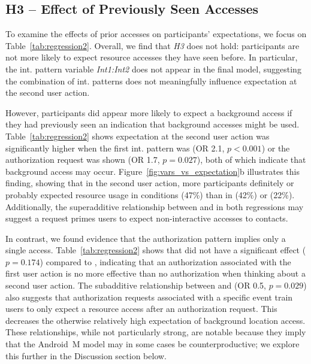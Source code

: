 \subsection{H3 -- Effect of Previously Seen Accesses}

To examine the effects of prior accesses on participants' expectations, we focus on Table~\ref{tab:regression2}. 
Overall, we find that \textit{H3} does not hold: participants are not
  more likely to expect resource accesses they 
have seen before. In particular, the int. pattern variable \textit{Int1:Int2} does not appear in the final 
model, suggesting the combination of int. patterns does not meaningfully influence expectation at the 
second user action.

However, participants did appear more likely to expect a background access if they had previously 
seen an indication that background accesses might be used. Table~\ref{tab:regression2} shows expectation at the second user action was significantly higher when the first int. pattern was \backgroundnotify{} (OR 2.1, $p<0.001$) or 
the \launch{} authorization request was shown (OR 1.7, $p=0.027$), both of which indicate that 
background access may occur. Figure~\ref{fig:vars_vs_expectation}b
illustrates this finding, showing that in the second user 
action, more participants definitely or probably expected resource usage in \launch{} conditions (47\%)
than in \first{} (42\%) or \never{} (22\%). 
Additionally, the superadditive relationship between \launch{}
and \contacts{} in both regressions may suggest a \launch{} request primes users to 
expect non-interactive accesses to contacts. 

In contrast, we found evidence that the authorization pattern \first{}
implies only a single access.  Table~\ref{tab:regression2} shows that
\first{} did not have a significant effect ($p = 0.174$) compared to
\never{}, indicating that an authorization associated with the first
user action is no more effective than no authorization when thinking
about a second user action. The subadditive relationship between
\location{} and \first{} (OR 0.5, $p=0.029$) also suggests that
authorization requests associated with a specific event train users to
only expect a resource access after an authorization request. This
decreases the otherwise relatively high expectation of background
location access. These relationships, while not particularly strong,
are notable because they imply that the Android~M model may in some
cases be counterproductive; we explore this further in the Discussion
section below.


